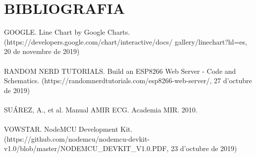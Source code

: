 \chapter{\uppercase{Bibliografia}}
GOOGLE. Line Chart by Google Charts. (https://developers.google.com/chart/interactive/docs/
gallery/linechart?hl=es, 20 de novembre de 2019) \\ \\
RANDOM NERD TUTORIALS. Build an ESP8266 Web Server - Code and Schematics. (https://randomnerdtutorials.com/esp8266-web-server/, 27 d'octubre de 2019) \\ \\
SUÁREZ, A., et al. Manual AMIR ECG. Academia MIR. 2010. \\ \\
VOWSTAR. NodeMCU Development Kit. (https://github.com/nodemcu/nodemcu-devkit-v1.0/blob/master/NODEMCU\_DEVKIT\_V1.0.PDF, 23 d'octubre de 2019)




